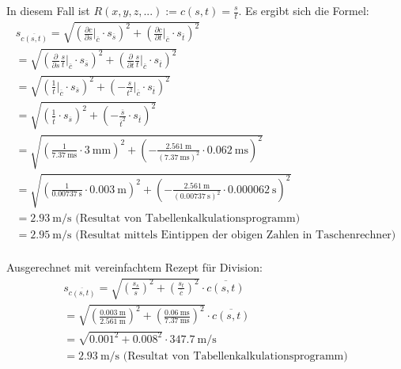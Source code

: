 In diesem Fall ist $R(x,y,z,...) := c(s,t) = \frac{s}{t}$. Es ergibt sich die Formel:
\begin{gather*}
    s_{\overline{c(s,t)}} = \sqrt{ \left( \frac{\partial c}{\partial s} \biggr\rvert_{\overline{c}} \cdot s_{\overline{s}}\right)^2
                            + \left( \frac{\partial c}{\partial t} \biggr\rvert_{\overline{c}} \cdot s_{\overline{t}}\right)^2 } \\
                            = \sqrt{ \left( \frac{\partial}{\partial s}\frac{s}{t} \biggr\rvert_{\overline{c}} \cdot s_{\overline{s}}\right)^2
                            + \left( \frac{\partial}{\partial t}\frac{s}{t} \biggr\rvert_{\overline{c}} \cdot s_{\overline{t}}\right)^2 } \\
                            = \sqrt{ \left( \frac{1}{t} \biggr\rvert_{\overline{c}} \cdot s_{\overline{s}}\right)^2
                            + \left( - \frac{s}{t^2} \biggr\rvert_{\overline{c}} \cdot s_{\overline{t}}\right)^2 } \\
                            = \sqrt{ \left( \frac{1}{\overline{t}} \cdot s_{\overline{s}}\right)^2
                            + \left( - \frac{\overline{s}}{\overline{t}^2} \cdot s_{\overline{t}}\right)^2 } \\
                            = \sqrt{ \left( \frac{1}{\SI{7.37}{\milli\second}} \cdot \SI{3}{\milli\meter} \right)^2
                            + \left( - \frac{\SI{2.561}{\meter}}{(\SI{7.37}{\milli\second})^2} \cdot \SI{0.062}{\milli\second}\right)^2 } \\
                            = \sqrt{ \left( \frac{1}{\SI{0.00737}{\second}} \cdot \SI{0.003}{\meter} \right)^2
                            + \left( - \frac{\SI{2.561}{\meter}}{(\SI{0.00737}{\second})^2} \cdot \SI{0.000062}{\second}\right)^2 } \\
                            = \SI{2.93}{\meter\per\second} \text{ (Resultat von Tabellenkalkulationsprogramm)} \\
                            = \SI{2.95}{\meter\per\second} \text{ (Resultat mittels Eintippen der obigen Zahlen in Taschenrechner)} \\
\end{gather*}

Ausgerechnet mit vereinfachtem Rezept f\"ur Division:
\begin{gather*}
    s_{\overline{c(s,t)}} = \sqrt{ \left( \frac{s_{s}}{s} \right)^2 + \left( \frac{s_{t}}{\overline{c}} \right)^2} \cdot \overline{c(s,t)} \\
    = \sqrt{ \left( \frac{\SI{0.003}{\meter}}{\SI{2.561}{\meter}} \right)^2 + \left( \frac{\SI{0.06}{\milli\second}}{\SI{7.37}{\milli\second}} \right)^2 } \cdot \overline{c(s,t)} \\
    = \sqrt{ 0.001^2 + 0.008^2} \cdot \SI{347.7}{\meter\per\second} \\
    = \SI{2.93}{\meter\per\second} \text{ (Resultat von Tabellenkalkulationsprogramm)}
\end{gather*}



